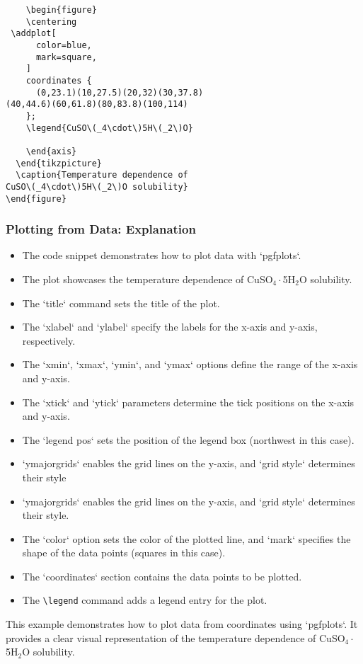 \documentclass{beamer}
\begin{document}
\begin{frame}[fragile]
\begin{verbatim}
	\begin{figure}
	\centering
 \addplot[
      color=blue,
      mark=square,
    ]
    coordinates {
      (0,23.1)(10,27.5)(20,32)(30,37.8)
(40,44.6)(60,61.8)(80,83.8)(100,114)
    };
    \legend{CuSO\(_4\cdot\)5H\(_2\)O}
    
    \end{axis}
  \end{tikzpicture}
  \caption{Temperature dependence of 
CuSO\(_4\cdot\)5H\(_2\)O solubility}
\end{figure}
  \end{verbatim}
\end{frame}
\begin{frame}
  \frametitle{Plotting from Data: Explanation}

  \begin{itemize}
    \item The code snippet demonstrates how to plot data with `pgfplots`.
    \item The plot showcases the temperature dependence of CuSO\(_4\cdot\)5H\(_2\)O solubility.
    \item The `title` command sets the title of the plot.
    \item The `xlabel` and `ylabel` specify the labels for the x-axis and y-axis, respectively.
    \item The `xmin`, `xmax`, `ymin`, and `ymax` options define the range of the x-axis and y-axis.
    \item The `xtick` and `ytick` parameters determine the tick positions on the x-axis and y-axis.
    \item The `legend pos` sets the position of the legend box (northwest in this case).
    \item `ymajorgrids` enables the grid lines on the y-axis, and `grid style` determines their style
  \end{itemize}
\end{frame}

\begin{frame}[fragile]
\begin{itemize}
 \item `ymajorgrids` enables the grid lines on the y-axis, and `grid style` determines their style.
    \item The `color` option sets the color of the plotted line, and `mark` specifies the shape of the data points (squares in this case).
    \item The `coordinates` section contains the data points to be plotted.
    \item The \texttt{\textbackslash legend} command adds a legend entry for the plot.
  \end{itemize}
  This example demonstrates how to plot data from coordinates using `pgfplots`. It provides a clear visual representation of the temperature dependence of CuSO\(_4\cdot\)5H\(_2\)O solubility.
\end{frame}
\end{document}
